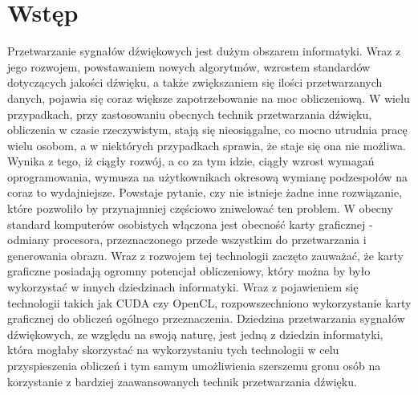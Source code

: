 \chapter*{Wstęp}

Przetwarzanie sygnałów dźwiękowych jest dużym obszarem informatyki. Wraz z jego rozwojem, powstawaniem nowych algorytmów, wzrostem standardów dotyczących jakości dźwięku, a także zwiększaniem się ilości przetwarzanych danych, pojawia się coraz większe zapotrzebowanie na moc obliczeniową. W wielu przypadkach, przy zastosowaniu obecnych technik przetwarzania dźwięku, obliczenia w czasie rzeczywistym, stają się nieosiągalne, co mocno utrudnia pracę wielu osobom, a w niektórych przypadkach sprawia, że staje się ona nie możliwa. Wynika z tego, iż ciągły rozwój, a co za tym idzie, ciągły wzrost wymagań oprogramowania, wymusza na użytkownikach okresową wymianę podzespołów na coraz to wydajniejsze. Powstaje pytanie, czy nie istnieje żadne inne rozwiązanie, które pozwoliło by przynajmniej częściowo zniwelować ten problem. W obecny standard komputerów osobistych włączona jest obecność karty graficznej - odmiany procesora, przeznaczonego przede wszystkim do przetwarzania i generowania obrazu. Wraz z rozwojem tej technologii zaczęto zauważać, że karty graficzne posiadają ogromny potencjał obliczeniowy, który można by było wykorzystać w innych dziedzinach informatyki. Wraz z pojawieniem się technologii takich jak CUDA\cite{bib:CUDA} czy OpenCL, rozpowszechniono wykorzystanie karty graficznej do obliczeń ogólnego przeznaczenia. Dziedzina przetwarzania sygnałów dźwiękowych, ze względu na swoją naturę, jest jedną z dziedzin informatyki, która mogłaby skorzystać na wykorzystaniu tych technologii w celu przyspieszenia obliczeń i tym samym umożliwienia szerszemu gronu osób na korzystanie z bardziej zaawansowanych technik przetwarzania dźwięku.
